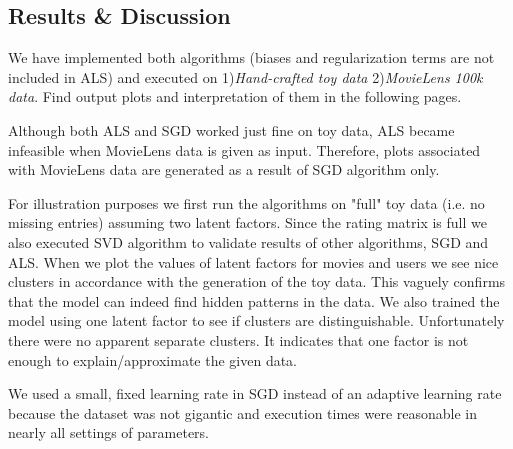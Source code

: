 \documentclass[11pt]{article}
\begin{document}
\begin{multicols}{2}
			
		
		
		
	
	
	
	
	\section{Results \& Discussion}
	We have implemented both algorithms (biases and regularization terms are not included in ALS) and executed on 1)\textit{Hand-crafted toy data} 2)\textit{MovieLens 100k data}. Find output plots and interpretation of them in the following pages. 
	
	Although both ALS and SGD worked just fine on toy data, ALS became infeasible when MovieLens data is given as input. Therefore, plots associated with MovieLens data are generated as a result of SGD algorithm only.
	
	For illustration purposes we first run the algorithms on "full" toy data (i.e. no missing entries) assuming two latent factors. Since the rating matrix is full we also executed SVD algorithm to validate results of other algorithms, SGD and ALS. When we plot the values of latent factors for movies and users we see nice clusters in accordance with the generation of the toy data. This vaguely confirms that the model can indeed find hidden patterns in the data. We also trained the model using one latent factor to see if clusters are distinguishable. Unfortunately there were no apparent separate clusters. It indicates that one factor is not enough to explain/approximate the given data.
	
	We used a small, fixed learning rate in SGD instead of an adaptive learning rate because the dataset was not gigantic and execution times were reasonable in nearly all settings of parameters. 
		

\end{multicols}
\end{document}
